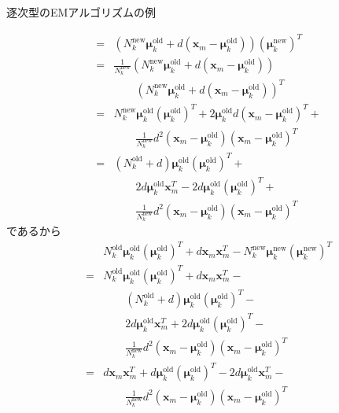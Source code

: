 \documentclass[dvipdfmx,notheorems,t]{beamer}
\begin{document}
\begin{frame}{逐次型のEMアルゴリズムの例}
\begin{itemize}
\begin{itemize}
\begin{eqnarray}
			&=& \left( N_k^\mathrm{new} \bm{\mu}_k^\mathrm{old} + d (\bm{x}_m - \bm{\mu}_k^\mathrm{old}) \right) (\bm{\mu}_k^\mathrm{new})^T \nonumber \\
			&=& \frac{1}{N_k^\mathrm{new}} \left( N_k^\mathrm{new} \bm{\mu}_k^\mathrm{old} + d (\bm{x}_m - \bm{\mu}_k^\mathrm{old}) \right) \nonumber \\
			&& \qquad \left( N_k^\mathrm{new} \bm{\mu}_k^\mathrm{old} + d \left( \bm{x}_m - \bm{\mu}_k^\mathrm{old} \right) \right)^T \nonumber \\
			&=& N_k^\mathrm{new} \bm{\mu}_k^\mathrm{old} (\bm{\mu}_k^\mathrm{old})^T + 2 \bm{\mu}_k^\mathrm{old} d \left( \bm{x}_m - \bm{\mu}_k^\mathrm{old} \right)^T + \nonumber \\
			&& \qquad \frac{1}{N_k^\mathrm{new}} d^2 \left( \bm{x}_m - \bm{\mu}_k^\mathrm{old} \right) \left( \bm{x}_m - \bm{\mu}_k^\mathrm{old} \right)^T \\
			&=& (N_k^\mathrm{old} + d) \bm{\mu}_k^\mathrm{old} (\bm{\mu}_k^\mathrm{old})^T + \nonumber \\
			&& \qquad 2d \bm{\mu}_k^\mathrm{old} \bm{x}_m^T - 2d \bm{\mu}_k^\mathrm{old} (\bm{\mu}_k^\mathrm{old})^T + \nonumber \\
			&& \qquad \frac{1}{N_k^\mathrm{new}} d^2 \left( \bm{x}_m - \bm{\mu}_k^\mathrm{old} \right) \left( \bm{x}_m - \bm{\mu}_k^\mathrm{old} \right)^T
		\end{eqnarray}
		であるから
		\begin{eqnarray}
			&& N_k^\mathrm{old} \bm{\mu}_k^\mathrm{old} (\bm{\mu}_k^\mathrm{old})^T + d \bm{x}_m \bm{x}_m^T - N_k^\mathrm{new} \bm{\mu}_k^\mathrm{new} (\bm{\mu}_k^\mathrm{new})^T \nonumber \\
			&=& N_k^\mathrm{old} \bm{\mu}_k^\mathrm{old} (\bm{\mu}_k^\mathrm{old})^T + d \bm{x}_m \bm{x}_m^T - \nonumber \\
			&& \qquad (N_k^\mathrm{old} + d) \bm{\mu}_k^\mathrm{old} (\bm{\mu}_k^\mathrm{old})^T - \nonumber \\
			&& \qquad 2d \bm{\mu}_k^\mathrm{old} \bm{x}_m^T + 2d \bm{\mu}_k^\mathrm{old} (\bm{\mu}_k^\mathrm{old})^T - \nonumber \\
			&& \qquad \frac{1}{N_k^\mathrm{new}} d^2 \left( \bm{x}_m - \bm{\mu}_k^\mathrm{old} \right) \left( \bm{x}_m - \bm{\mu}_k^\mathrm{old} \right)^T \nonumber \\
			&=& d \bm{x}_m \bm{x}_m^T + d \bm{\mu}_k^\mathrm{old} (\bm{\mu}_k^\mathrm{old})^T - 2d \bm{\mu}_k^\mathrm{old} \bm{x}_m^T - \nonumber \\
			&& \qquad \frac{1}{N_k^\mathrm{new}} d^2 \left( \bm{x}_m - \bm{\mu}_k^\mathrm{old} \right) \left( \bm{x}_m - \bm{\mu}_k^\mathrm{old} \right)^T \nonumber \\

\end{eqnarray}
\end{itemize}
\end{itemize}
\end{frame}
\end{document}
